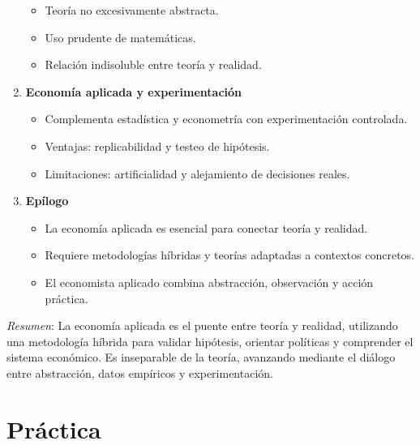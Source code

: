 \documentclass[12pt]{book} %
\providecommand{\tightlist}{%
  \setlength{\itemsep}{0pt}\setlength{\parskip}{0pt}}
\begin{document}
\begin{enumerate}
  \begin{itemize}
  \tightlist
  \item
    Teoría no excesivamente abstracta.
  \item
    Uso prudente de matemáticas.
  \item
    Relación indisoluble entre teoría y realidad.
  \end{itemize}
\item
  \textbf{Economía aplicada y experimentación}

  \begin{itemize}
  \tightlist
  \item
    Complementa estadística y econometría con experimentación
    controlada.
  \item
    Ventajas: replicabilidad y testeo de hipótesis.
  \item
    Limitaciones: artificialidad y alejamiento de decisiones reales.
  \end{itemize}
\item
  \textbf{Epílogo}

  \begin{itemize}
  \tightlist
  \item
    La economía aplicada es esencial para conectar teoría y realidad.
  \item
    Requiere metodologías híbridas y teorías adaptadas a contextos
    concretos.
  \item
    El economista aplicado combina abstracción, observación y acción
    práctica.
  \end{itemize}
\end{enumerate}

\emph{Resumen}: La economía aplicada es el puente entre teoría y
realidad, utilizando una metodología híbrida para validar hipótesis,
orientar políticas y comprender el sistema económico. Es inseparable de
la teoría, avanzando mediante el diálogo entre abstracción, datos
empíricos y experimentación.


% 

\part{Práctica}
% 
% 


\end{document}
